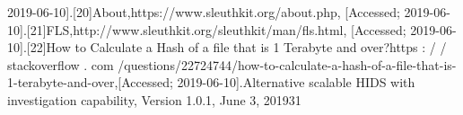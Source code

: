 \documentclass[
	a4paper,					%
	10pt,							%
	twoside,					%
	openright,				%
	notitlepage,			%
	parskip=half,			%
]{scrreprt}					%
\begin{document}
2019-06-10].[20]About,https://www.sleuthkit.org/about.php, [Accessed; 2019-06-10].[21]FLS,http://www.sleuthkit.org/sleuthkit/man/fls.html, [Accessed; 2019-06-10].[22]How to Calculate a Hash of a file that is 1 Terabyte and over?https : / / stackoverflow . com /questions/22724744/how-to-calculate-a-hash-of-a-file-that-is-1-terabyte-and-over,[Accessed; 2019-06-10].Alternative scalable HIDS with investigation capability, Version 1.0.1, June 3, 201931

\cleardoublepage
{} 
{}
\printglossary[type=acronym]
\printglossary

\cleardoublepage
{} 
\printbibliography[heading=bibintoc]


\cleardoublepage
{} 
{}
\listoffigures
\cleardoublepage
{} 
{}
\listoftables
\cleardoublepage
{} 
{}
\lstlistoflistings


\appendix
{}







\newpage

\end{document}
